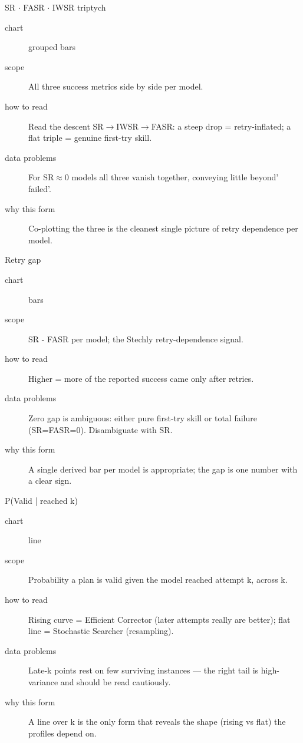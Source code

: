 \begin{bmplotcard}{SR \(\cdot\) FASR \(\cdot\) IWSR triptych}
\begin{description}
\item[chart] grouped bars
\item[scope] All three success metrics side by side per model.
\item[how to read] Read the descent SR\(\rightarrow\)IWSR\(\rightarrow\)FASR: a steep drop = retry-inflated; a flat triple = genuine first-try skill.
\item[data problems] For SR\(\approx\)0 models all three vanish together, conveying little beyond' failed'.
\item[why this form] Co-plotting the three is the cleanest single picture of retry dependence per model.
\end{description}
\end{bmplotcard}

\begin{bmplotcard}{Retry gap}
\begin{description}
\item[chart] bars
\item[scope] SR - FASR per model; the Stechly retry-dependence signal.
\item[how to read] Higher = more of the reported success came only after retries.
\item[data problems] Zero gap is ambiguous: either pure first-try skill or total failure (SR=FASR=0). Disambiguate with SR.
\item[why this form] A single derived bar per model is appropriate; the gap is one number with a clear sign.
\end{description}
\end{bmplotcard}

\begin{bmplotcard}{P(Valid | reached k)}
\begin{description}
\item[chart] line
\item[scope] Probability a plan is valid given the model reached attempt k, across k.
\item[how to read] Rising curve = Efficient Corrector (later attempts really are better); flat line = Stochastic Searcher (resampling).
\item[data problems] Late-k points rest on few surviving instances --- the right tail is high-variance and should be read cautiously.
\item[why this form] A line over k is the only form that reveals the shape (rising vs flat) the profiles depend on.
\end{description}
\end{bmplotcard}


